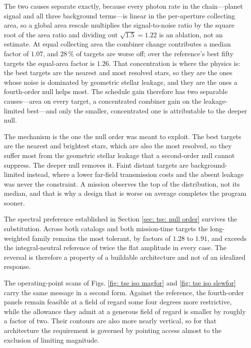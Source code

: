 \documentclass[12pt,a4paper]{article}
\numberwithin{equation}{section}
\numberwithin{figure}{section}
\numberwithin{table}{section}
\begin{document}
The two causes separate exactly, because every photon rate in the chain---planet signal and all three background terms---is linear in the per-aperture collecting area, so a global area rescale multiplies the signal-to-noise ratio by the square root of the area ratio and dividing out $\sqrt{1.5}=1.22$ is an ablation, not an estimate. At equal collecting area the combiner change contributes a median factor of $1.07$, and $28\,\%$ of targets are worse off; over the reference's best fifty targets the equal-area factor is $1.26$. That concentration is where the physics is: the best targets are the nearest and most resolved stars, so they are the ones whose noise is dominated by geometric stellar leakage, and they are the ones a fourth-order null helps most. The schedule gain therefore has two separable causes---area on every target, a concentrated combiner gain on the leakage-limited best---and only the smaller, concentrated one is attributable to the deeper null.

The mechanism is the one the null order was meant to exploit. The best targets are the nearest and brightest stars, which are also the most resolved, so they suffer most from the geometric stellar leakage that a second-order null cannot suppress. The deeper null removes it. Faint distant targets are background-limited instead, where a lower far-field transmission costs and the absent leakage was never the constraint. A mission observes the top of the distribution, not its median, and that is why a design that is worse on average completes the program sooner.

The spectral preference established in Section \ref{sec: tse: null order} survives the substitution. Across both catalogs and both mission-time targets the long-weighted family remains the most tolerant, by factors of $1.28$ to $1.91$, and exceeds the integral-neutral reference of twice the flat amplitude in every case. The reversal is therefore a property of a buildable architecture and not of an idealized response.

The operating-point scans of Figs. \ref{fig: tse iso magfor} and \ref{fig: tse iso slewfor} carry the same message in a second form. Against the reference, the fourth-order panels remain feasible at a field of regard some four degrees more restrictive, while the allowance they admit at a generous field of regard is smaller by roughly a factor of two. Their contours are also more nearly vertical, so for that architecture the requirement is governed by pointing access almost to the exclusion of limiting magnitude.
\end{document}
